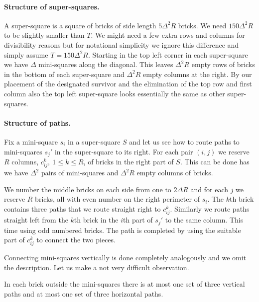 \documentclass{theoretics}
\begin{document}
\paragraph{Structure of super-squares.}
A super-square
is a square of bricks of side length $5 \Delta^2 R$ bricks.
We need $150 \Delta^2 R$ to be slightly smaller than $T$.
We might need a few extra rows and columns for divisibility
reasons but for notational simplicity we ignore this difference
and simply assume $T=150 \Delta^2 R$.
Starting in the top left corner in each super-square
we have $\Delta$ mini-squares
along the diagonal.  This leaves $\Delta^2 R$ empty rows
of bricks in the bottom of each super-square and $\Delta^2 R$ empty
columns at the right.
By our placement of the designated survivor and the elimination
of the top row and first column also the top left super-square
looks essentially the same as other super-squares. 

\paragraph{Structure of paths.}
Fix a mini-square $s_i$ in a super-square $S$ and let us see how to
route paths to mini-squares $s_j'$ in the super-square to its right.  For
each pair $(i,j)$ we reserve $R$ columns, $c_{ij}^k, \ 1 \leq k \leq R$, 
of bricks in the right part of $S$.  This can be done has
we have $\Delta^2$ pairs of mini-squares and $\Delta^2 R$
empty columns of bricks.

We number the middle bricks on each side from
one to $2 \Delta R$ and for each $j$ we reserve $R$ bricks, 
all with even number
on the right perimeter of $s_i$.  The $k$th brick contains
three paths that we route straight right to $c_{ij}^k$.
Similarly we route paths straight left from the $k$th brick 
in the $i$th part of $s_j'$ to the same column.  This time
using odd numbered bricks.  The path is completed
by using the suitable part of $c_{ij}^k$ to connect the
two pieces.  

Connecting mini-squares vertically is done completely analogously
and we omit the description.  Let us make a not very difficult observation.

\begin{lemma}\label{lemma:disjoint paths}
In each brick outside the mini-squares there is
at most one set of three vertical paths and at most
one set of three horizontal paths.
\end{lemma}
\end{document}
